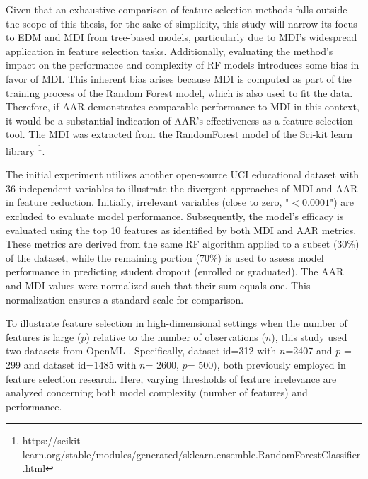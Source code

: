 Given that an exhaustive comparison of feature selection methods falls outside the scope of this thesis, for the sake of simplicity, this study will narrow its focus to \gls{EDM} and \gls{MDI} from tree-based models, particularly due to \gls{MDI}'s widespread application in feature selection tasks. Additionally, evaluating the method's impact on the performance and complexity of RF models introduces some bias in favor of \gls{MDI}. This inherent bias arises because \gls{MDI} is computed as part of the training process of the Random Forest model, which is also used to fit the data. Therefore, if \gls{AAR} demonstrates comparable performance to \gls{MDI} in this context, it would be a substantial indication of \gls{AAR}'s effectiveness as a feature selection tool. The \gls{MDI} was extracted from the RandomForest model of the Sci-kit learn library \footnote{https://scikit-learn.org/stable/modules/generated/sklearn.ensemble.RandomForestClassifier.html}. 

The initial experiment utilizes another open-source UCI educational dataset \cite{RealinhoValentim2021PredictSuccess} with 36 independent variables to illustrate the divergent approaches of \gls{MDI} and \gls{AAR} in feature reduction. Initially, irrelevant variables (close to zero, "\(< 0.0001\)") are excluded to evaluate model performance. Subsequently, the model's efficacy is evaluated using the top 10 features as identified by both \gls{MDI} and \gls{AAR} metrics. These metrics are derived from the same RF algorithm applied to a subset (30\%) of the dataset, while the remaining portion (70\%) is used to assess model performance in predicting student dropout (enrolled or graduated). The \gls{AAR} and \gls{MDI} values were normalized such that their sum equals one. This normalization ensures a standard scale for comparison. 

To illustrate feature selection in high-dimensional settings when the number of features is large (\(p\)) relative to the number of observations (\(n\)), this study used two datasets from OpenML \cite{Vanschoren2014OpenML}. Specifically, dataset id=312 with \(n\)=2407 and \(p\) = 299 and dataset id=1485 with \(n\)= 2600, \(p\)= 500), both previously employed in feature selection research. Here, varying thresholds of feature irrelevance are analyzed concerning both model complexity (number of features) and performance.





